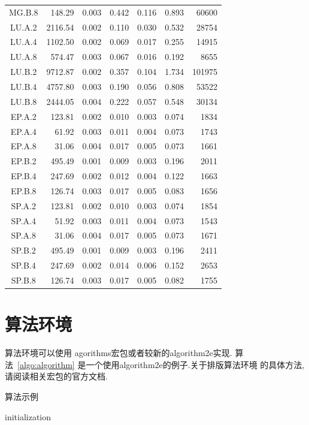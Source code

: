 \documentclass[a4paper,punct=banjiao,twoside]{ctexrep}
\theoremstyle{plain}
\theoremstyle{definition}
\theoremstyle{remark}
\begin{document}
\begin{longtable}[c]{c*{6}{r}}
    MG.B.8 & 148.29 & 0.003 & 0.442 & 0.116 & 0.893 & 60600 \\
    LU.A.2 & 2116.54 & 0.002 & 0.110 & 0.030 & 0.532 & 28754 \\
    LU.A.4 & 1102.50 & 0.002 & 0.069 & 0.017 & 0.255 & 14915 \\
    LU.A.8 & 574.47 & 0.003 & 0.067 & 0.016 & 0.192 & 8655 \\
    LU.B.2 & 9712.87 & 0.002 & 0.357 & 0.104 & 1.734 & 101975 \\
    LU.B.4 & 4757.80 & 0.003 & 0.190 & 0.056 & 0.808 & 53522 \\
    LU.B.8 & 2444.05 & 0.004 & 0.222 & 0.057 & 0.548 & 30134 \\
    EP.A.2 & 123.81 & 0.002 & 0.010 & 0.003 & 0.074 & 1834 \\
    EP.A.4 & 61.92 & 0.003 & 0.011 & 0.004 & 0.073 & 1743 \\
    EP.A.8 & 31.06 & 0.004 & 0.017 & 0.005 & 0.073 & 1661 \\
    EP.B.2 & 495.49 & 0.001 & 0.009 & 0.003 & 0.196 & 2011 \\
    EP.B.4 & 247.69 & 0.002 & 0.012 & 0.004 & 0.122 & 1663 \\
    EP.B.8 & 126.74 & 0.003 & 0.017 & 0.005 & 0.083 & 1656 \\
    SP.A.2 & 123.81 & 0.002 & 0.010 & 0.003 & 0.074 & 1854 \\
    SP.A.4 & 51.92 & 0.003 & 0.011 & 0.004 & 0.073 & 1543 \\
    SP.A.8 & 31.06 & 0.004 & 0.017 & 0.005 & 0.073 & 1671 \\
    SP.B.2 & 495.49 & 0.001 & 0.009 & 0.003 & 0.196 & 2411 \\
    SP.B.4 \tnote{a} & 247.69 & 0.002 & 0.014 & 0.006 & 0.152 & 2653 \\
    SP.B.8 \tnote{b} & 126.74 & 0.003 & 0.017 & 0.005 & 0.082 & 1755 \\
  \bottomrule
\end{longtable}



\section{算法环境}

算法环境可以使用 agorithms宏包或者较新的algorithm2e实现.
算法~\ref{algo:algorithm} 是一个使用algorithm2e的例子.关于排版算法环境
的具体方法,请阅读相关宏包的官方文档.

\begin{algorithm}[H] 
  \caption{算法示例}
  \label{algo:algorithm}
  \small
  \SetAlgoLined

  initialization\;
\end{algorithm}
\end{document}

